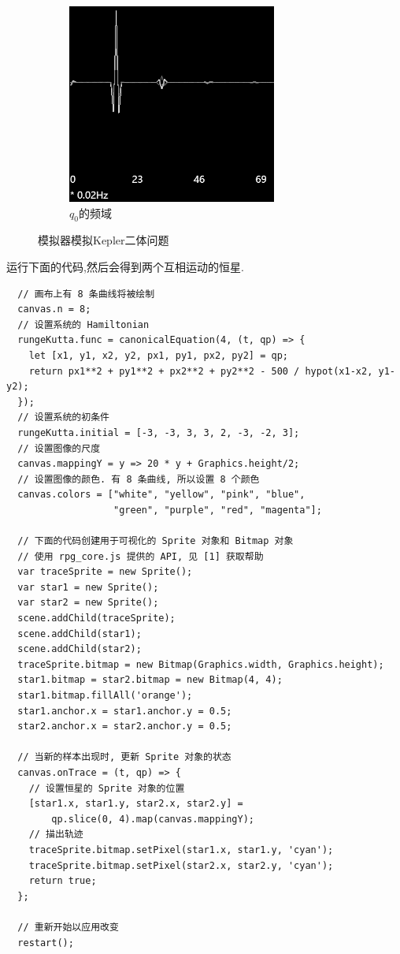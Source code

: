 \documentclass[12pt]{article}
\begin{document}
\begin{figure}[h]
\begin{subfigure}[b]{0.2\linewidth}
    \includegraphics[width=\linewidth]{kepler_2_body_q0_frequencies.png}
    \caption{$q_0$的频域}
  \end{subfigure}
  \caption{模拟器模拟Kepler二体问题}
  \label{fig:kepler}
\end{figure}

运行下面的代码,然后会得到两个互相运动的恒星.

\begin{verbatim}
  // 画布上有 8 条曲线将被绘制
  canvas.n = 8;
  // 设置系统的 Hamiltonian
  rungeKutta.func = canonicalEquation(4, (t, qp) => {
    let [x1, y1, x2, y2, px1, py1, px2, py2] = qp;
    return px1**2 + py1**2 + px2**2 + py2**2 - 500 / hypot(x1-x2, y1-y2);
  });
  // 设置系统的初条件
  rungeKutta.initial = [-3, -3, 3, 3, 2, -3, -2, 3];
  // 设置图像的尺度
  canvas.mappingY = y => 20 * y + Graphics.height/2;
  // 设置图像的颜色. 有 8 条曲线, 所以设置 8 个颜色
  canvas.colors = ["white", "yellow", "pink", "blue",
                   "green", "purple", "red", "magenta"];

  // 下面的代码创建用于可视化的 Sprite 对象和 Bitmap 对象
  // 使用 rpg_core.js 提供的 API, 见 [1] 获取帮助
  var traceSprite = new Sprite();
  var star1 = new Sprite();
  var star2 = new Sprite();
  scene.addChild(traceSprite);
  scene.addChild(star1);
  scene.addChild(star2);
  traceSprite.bitmap = new Bitmap(Graphics.width, Graphics.height);
  star1.bitmap = star2.bitmap = new Bitmap(4, 4);
  star1.bitmap.fillAll('orange');
  star1.anchor.x = star1.anchor.y = 0.5;
  star2.anchor.x = star2.anchor.y = 0.5;

  // 当新的样本出现时, 更新 Sprite 对象的状态
  canvas.onTrace = (t, qp) => {
    // 设置恒星的 Sprite 对象的位置
    [star1.x, star1.y, star2.x, star2.y] =
        qp.slice(0, 4).map(canvas.mappingY);
    // 描出轨迹
    traceSprite.bitmap.setPixel(star1.x, star1.y, 'cyan');
    traceSprite.bitmap.setPixel(star2.x, star2.y, 'cyan');
    return true;
  };

  // 重新开始以应用改变
  restart();
\end{verbatim}
\end{document}
